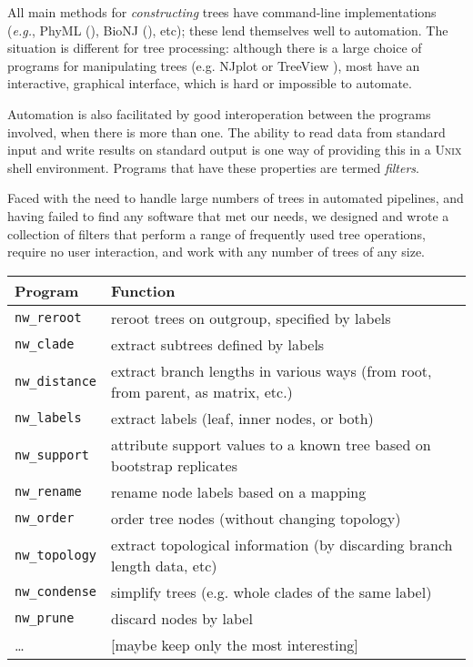 \documentclass{article}
\newcommand{\prog}[1]{\texttt{nw\_#1}}
\newcommand{\nutils}{Newick Utilities}
\newcommand{\unix}{\textsc{Unix}}
\begin{document}
All main methods for \textit{constructing} trees have command-line implementations (\textit{e.g.}, PhyML (\cite{Guindon2003}), BioNJ (\cite{Gascuel1997}), etc); these lend themselves well to automation. 
The situation is different for tree processing: although there is a large choice of programs for manipulating trees (e.g.
NJplot \cite{Perrière1996} or TreeView \cite{Page2002}), most have an interactive, graphical interface, which is hard or impossible to automate.

Automation is also facilitated by good interoperation between the programs involved, when there is more than one. The ability to read data from standard input and write results on standard output is one way of providing this in a \unix{} shell environment. Programs that have these properties are termed \textit{filters}.

Faced with the need to handle large numbers of trees in automated pipelines, and having failed to find any software that met our needs, we designed and wrote a collection of filters that perform a range of frequently used tree operations, require no user interaction, and work with any number of trees of any size. 

\begin{table}[!t]
\begin{tabular*}{\textwidth}{lp{}}
Program & Function \\ 
\hline 
\prog{reroot} & reroot trees on outgroup, specified by labels \\
\prog{clade} & extract subtrees defined by labels \\
\prog{distance} & extract branch lengths in various ways (from root, from parent, as matrix, etc.) \\
\prog{labels} & extract labels (leaf, inner nodes, or both) \\
\prog{support} & attribute support values to a known tree based on bootstrap replicates \\
\prog{rename} & rename node labels based on a mapping \\
\prog{order} & order tree nodes (without changing topology) \\
\prog{topology} & extract topological information (by discarding branch length data, etc) \\
\prog{condense} & simplify trees (e.g. whole clades of the same label) \\
\prog{prune} & discard nodes by label \\
 \ldots & [maybe keep only the most interesting] \\
\hline
\end{tabular*}
\end{table}
\end{document}
